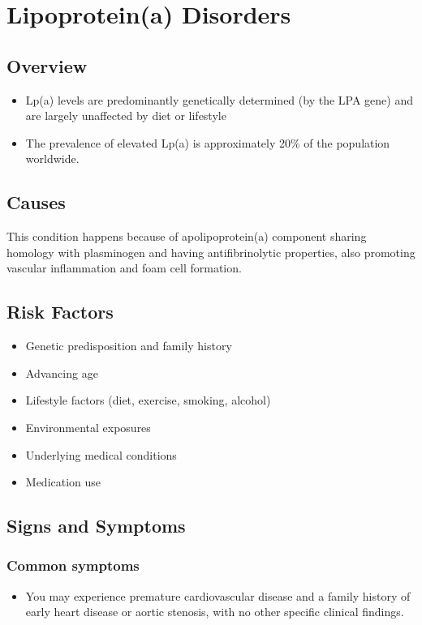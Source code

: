 \chapter{Lipoprotein(a) Disorders}
\label{sec:Lipoprotein(a) Disorders}

\section{Overview}


\begin{itemize}[noitemsep]
  \item Lp(a) levels are predominantly genetically determined (by the LPA gene) and are largely unaffected by diet or lifestyle
  \item The prevalence of elevated Lp(a) is approximately 20\% of the population worldwide.
\end{itemize}
\section{Causes}
This condition happens because of apolipoprotein(a) component sharing homology with plasminogen and having antifibrinolytic properties, also promoting vascular inflammation and foam cell formation.     
\section{Risk Factors}

\begin{itemize}[noitemsep]
  \item Genetic predisposition and family history
  \item Advancing age
  \item Lifestyle factors (diet, exercise, smoking, alcohol)
  \item Environmental exposures
  \item Underlying medical conditions
  \item Medication use
\end{itemize}
\section{Signs and Symptoms}

\subsection{Common symptoms}
\begin{itemize}[noitemsep]
  \item You may experience premature cardiovascular disease and a family history of early heart disease or aortic stenosis, with no other specific clinical findings. 
  \end{itemize}

